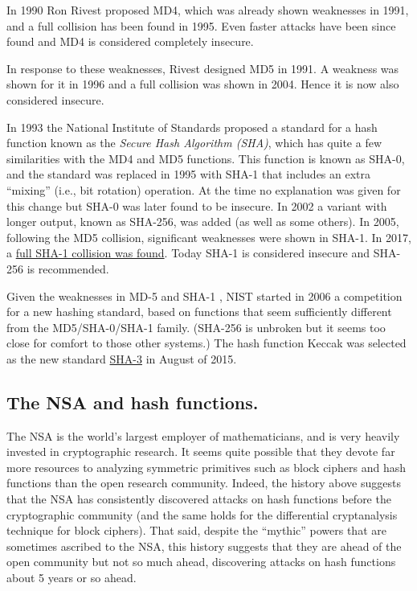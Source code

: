 In 1990 Ron Rivest proposed MD4, which was already shown weaknesses in
1991, and a full collision has been found in 1995. Even faster attacks
have been since found and MD4 is considered completely insecure.

In response to these weaknesses, Rivest designed MD5 in 1991. A weakness
was shown for it in 1996 and a full collision was shown in 2004. Hence
it is now also considered insecure.

In 1993 the National Institute of Standards proposed a standard for a
hash function known as the \emph{Secure Hash Algorithm (SHA)}, which has
quite a few similarities with the MD4 and MD5 functions. This function
is known as SHA-0, and the standard was replaced in 1995 with SHA-1 that
includes an extra ``mixing'' (i.e., bit rotation) operation. At the time
no explanation was given for this change but SHA-0 was later found to be
insecure. In 2002 a variant with longer output, known as SHA-256, was
added (as well as some others). In 2005, following the MD5 collision,
significant weaknesses were shown in SHA-1. In 2017, a
\href{https://goo.gl/jdqUX9}{full SHA-1 collision was found}. Today
SHA-1 is considered insecure and SHA-256 is recommended.

Given the weaknesses in MD-5 and SHA-1 , NIST started in 2006 a
competition for a new hashing standard, based on functions that seem
sufficiently different from the MD5/SHA-0/SHA-1 family. (SHA-256 is
unbroken but it seems too close for comfort to those other systems.) The
hash function Keccak was selected as the new standard
\href{https://goo.gl/Bx1bu2}{SHA-3} in August of 2015.

\subsection{The NSA and hash
functions.}\label{The-NSA-and-hash-function}

The NSA is the world's largest employer of mathematicians, and is very
heavily invested in cryptographic research. It seems quite possible that
they devote far more resources to analyzing symmetric primitives such as
block ciphers and hash functions than the open research community.
Indeed, the history above suggests that the NSA has consistently
discovered attacks on hash functions before the cryptographic community
(and the same holds for the differential cryptanalysis technique for
block ciphers). That said, despite the ``mythic'' powers that are
sometimes ascribed to the NSA, this history suggests that they are ahead
of the open community but not so much ahead, discovering attacks on hash
functions about 5 years or so ahead.

